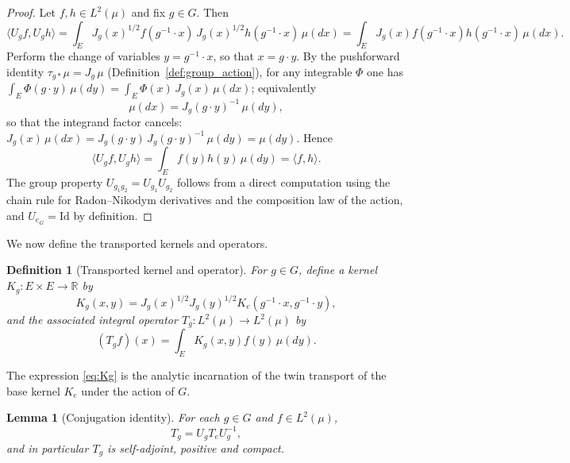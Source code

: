 \documentclass[11pt,a4paper]{article}
\newtheorem{lemma}[theorem]{Lemma}
\newtheorem{definition}[theorem]{Definition}
\newcommand{\R}{\mathbb{R}}
\newcommand{\ip}[2]{\langle #1, #2 \rangle}
\begin{document}
\begin{proof}
Let $f, h \in L^2(\mu)$ and fix $g \in G$. Then
\[
\ip{U_g f}{U_g h} = \int_E J_g(x)^{1/2} f(g^{-1} \cdot x) \, J_g(x)^{1/2} h(g^{-1} \cdot x) \, \mu(dx) = \int_E J_g(x) f(g^{-1} \cdot x) h(g^{-1} \cdot x) \, \mu(dx).
\]
Perform the change of variables $y = g^{-1} \cdot x$, so that $x = g \cdot y$. By the pushforward identity $\tau_{g*}\mu = J_g\,\mu$ (Definition~\ref{def:group_action}), for any integrable $\Phi$ one has $\int_E \Phi(g\cdot y)\,\mu(dy) = \int_E \Phi(x)\,J_g(x)\,\mu(dx)$; equivalently
\[
\mu(dx) = J_g(g \cdot y)^{-1} \, \mu(dy),
\]
so that the integrand factor cancels: $J_g(x)\,\mu(dx) = J_g(g\cdot y)\,J_g(g\cdot y)^{-1}\,\mu(dy) = \mu(dy)$. Hence
\[
\ip{U_g f}{U_g h} = \int_E f(y) h(y) \, \mu(dy) = \ip{f}{h}.
\]
The group property $U_{g_1 g_2} = U_{g_1} U_{g_2}$ follows from a direct computation using the chain rule for Radon--Nikodym derivatives and the composition law of the action, and $U_{e_G} = \mathrm{Id}$ by definition.
\end{proof}

We now define the transported kernels and operators.

\begin{definition}[Transported kernel and operator]\label{def:transported_kernel}
For $g \in G$, define a kernel $K_g : E \times E \to \R$ by
\begin{equation}\label{eq:Kg}
K_g(x, y) = J_g(x)^{1/2} J_g(y)^{1/2} K_e(g^{-1} \cdot x, g^{-1} \cdot y),
\end{equation}
and the associated integral operator $T_g : L^2(\mu) \to L^2(\mu)$ by
\begin{equation}\label{eq:Tg}
(T_g f)(x) = \int_E K_g(x, y) f(y) \, \mu(dy).
\end{equation}
\end{definition}

The expression \eqref{eq:Kg} is the analytic incarnation of the twin transport of the base kernel $K_e$ under the action of $G$.

\begin{lemma}[Conjugation identity]\label{lem:conjugation}
For each $g \in G$ and $f \in L^2(\mu)$,
\begin{equation}\label{eq:conjugation}
T_g = U_g T_e U_g^{-1},
\end{equation}
and in particular $T_g$ is self-adjoint, positive and compact.
\end{lemma}
\end{document}
